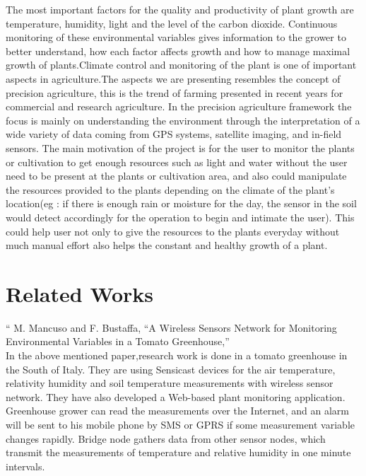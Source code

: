 \documentclass[10pt]{article}
\begin{document}
The most important factors for the quality and productivity of plant growth are temperature, humidity, light and the level of the carbon dioxide. Continuous monitoring of these environmental variables gives information to the grower to better understand, how each factor affects growth and how to manage maximal growth of plants.Climate control and monitoring of the plant is one of important aspects in agriculture.The aspects we are presenting resembles the concept of precision agriculture, this is the trend of farming presented in recent years for commercial and research agriculture. In the precision agriculture framework the focus is mainly on understanding the environment through the interpretation of a wide variety of data coming from GPS systems, satellite imaging, and in-field sensors. The main motivation of the project is for the user to monitor the plants or cultivation to get enough resources such as light and water without the user need to be present at the plants or cultivation area, and also could manipulate the resources provided to the plants depending on the climate of the plant’s location(eg : if there is enough rain or moisture for the day, the sensor in the soil would detect accordingly for the operation to begin and intimate the user). This could help user not only to give the resources to the plants everyday without much manual effort also helps the constant and healthy growth of a plant.


\section*{Related Works}

“ M. Mancuso and F. Bustaffa, “A Wireless Sensors Network for Monitoring Environmental Variables in a Tomato Greenhouse,”\\


In the above mentioned paper,research work is done in a tomato greenhouse in the South of Italy. They are using Sensicast devices for the air temperature, relativity humidity and soil temperature measurements with wireless sensor network. They have also developed a Web-based plant monitoring application. Greenhouse grower can read the measurements over the Internet, and an alarm will be sent to his mobile phone by SMS or GPRS if some measurement variable changes rapidly. Bridge node gathers data from other sensor nodes, which transmit the measurements of temperature and relative humidity in one minute intervals. 
\end{document}
